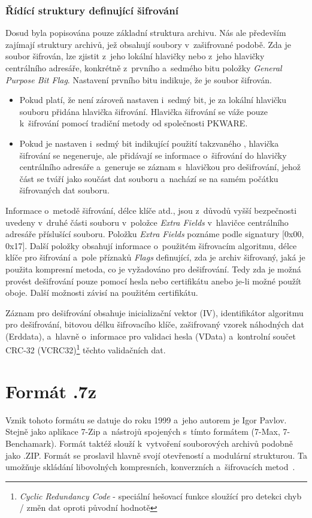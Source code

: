 \subsubsection{Řídící struktury definující šifrování}
 Dosud byla popisována pouze základní struktura archivu. Nás ale především zajímají struktury
archivů, jež obsahují soubory v~zašifrované podobě. Zda je soubor šifrován, lze zjistit z~jeho
lokální hlavičky nebo z~jeho hlavičky centrálního adresáře, konkrétně z~prvního a~sedmého bitu
položky {\it General Purpose Bit Flag}. Nastavení prvního bitu indikuje, že je soubor šifrován.
\begin{itemize}
    \item Pokud platí, že není zároveň nastaven i~sedmý bit, je za lokální hlavičku souboru
        přidána hlavička šifrování. Hlavička šifrování se váže pouze k~šifrování pomocí tradiční
        metody od společnosti PKWARE.
    \item Pokud je nastaven i~sedmý bit indikující použití takzvaného , hlavička šifrování se negeneruje, ale přidávají se informace o~šifrování do
        hlavičky centrálního adresáře a~generuje se záznam s~hlavičkou pro dešifrování, jehož
	část se tváří jako součást dat souboru a~nachází se na samém počátku šifrovaných dat
	souboru.
\end{itemize}
Informace o~metodě šifrování, délce klíče atd., jsou z~důvodů vyšší bezpečnosti uvedeny v~druhé
části souboru v~položce {\it Extra Fields} v~hlavičce centrálního adresáře příslušící souboru.
Položku {\it Extra Fields} poznáme podle signatury [0x00, 0x17]. Další položky obsahují informace
o~použitém šifrovacím algoritmu, délce klíče pro šifrování a~pole příznaků {\it Flags} definující,
zda je archiv šifrovaný, jaká je použita kompresní metoda, co je vyžadováno pro dešifrování. Tedy
zda je možná provést dešifrování pouze pomocí hesla nebo certifikátu anebo je-li možné použít
oboje. Další možnosti závisí na použitém certifikátu.

 Záznam pro dešifrování obsahuje inicializační vektor (IV), identifikátor algoritmu pro
dešifrování, bitovou délku šifrovacího klíče, zašifrovaný vzorek náhodných dat (Erddata), a~hlavně
o~informace pro validaci hesla (VData) a~kontrolní součet CRC-32 (VCRC32)\footnote{{\it Cyclic Redundancy Code} -
speciální hešovací funkce sloužící pro detekci chyb / změn dat oproti původní hodnotě} těchto
validačních dat. 

\section{Formát .7z}
\label{sec:7z}
Vznik tohoto formátu se datuje do roku 1999 a~jeho autorem je Igor Pavlov. Stejně jako aplikace
7-Zip a~nástrojů spojených s~tímto formátem (7-Max, 7-Benchamark). Formát taktéž slouží
k~vytvoření souborových archivů podobně jako .ZIP. Formát se proslavil hlavně svojí otevřeností a
modulární strukturou. Ta umožňuje skládání libovolných kompresních, konverzních a~šifrovacích
metod~\cite{7z:2015}.

